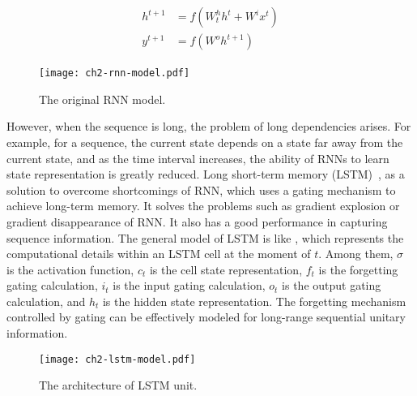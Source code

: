 \begin{align}\label{fml:rnn-train}
    \begin{split}
        h^{t+1} & =f(W^h_{t} h^t+W^i x^t) \\
        y^{t+1} & =f(W^o h^{t+1})
    \end{split}
\end{align}


\begin{figure}[htb]
    \centering
    \texttt{[image: ch2-rnn-model.pdf]}
    \caption{The original RNN model.}\label{fig:ch2-rnn-model}
\end{figure}


However, when the sequence is long, the problem of long dependencies arises. For example, for a sequence, the current state depends on a state far away from the current state, and as the time interval increases, the ability of RNNs to learn state representation is greatly reduced. Long short-term memory (LSTM)~\cite{lstm1997, lindemann2020survey}, as a solution to overcome shortcomings of RNN, which uses a gating mechanism to achieve long-term memory. It solves the problems such as gradient explosion or gradient disappearance of RNN. It also has a good performance in capturing sequence information. The general model of LSTM is like \figname{\ref{fig:ch2-lstm-model}}, which represents the computational details within an LSTM cell at the moment of \(t\). Among them, \(\sigma\) is the activation function, \(c_t\) is the cell state representation, \(f_t\) is the forgetting gating calculation, \(i_t\) is the input gating calculation, \(o_t\) is the output gating calculation, and \(h_t\) is the hidden state representation. The forgetting mechanism controlled by gating can be effectively modeled for long-range sequential unitary information.

\begin{figure}[htb]
    \centering
    \texttt{[image: ch2-lstm-model.pdf]}
    \caption{The architecture of LSTM unit.}\label{fig:ch2-lstm-model}
\end{figure}

